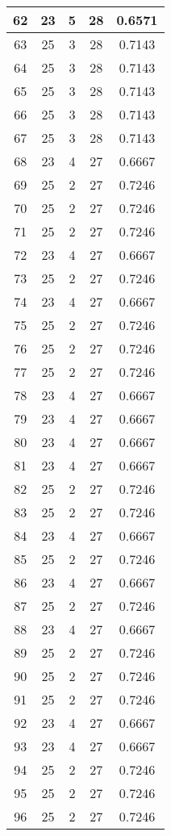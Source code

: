 \documentclass[letterpaper, 12pt]{article}
\begin{document}
\begin{longtable}{|c|c|c|c|c|}
\hline
62 & 23 & 5 & 28 & 0.6571 \\
\hline
63 & 25 & 3 & 28 & 0.7143 \\
\hline
64 & 25 & 3 & 28 & 0.7143 \\
\hline
65 & 25 & 3 & 28 & 0.7143 \\
\hline
66 & 25 & 3 & 28 & 0.7143 \\
\hline
67 & 25 & 3 & 28 & 0.7143 \\
\hline
68 & 23 & 4 & 27 & 0.6667 \\
\hline
69 & 25 & 2 & 27 & 0.7246 \\
\hline
70 & 25 & 2 & 27 & 0.7246 \\
\hline
71 & 25 & 2 & 27 & 0.7246 \\
\hline
72 & 23 & 4 & 27 & 0.6667 \\
\hline
73 & 25 & 2 & 27 & 0.7246 \\
\hline
74 & 23 & 4 & 27 & 0.6667 \\
\hline
75 & 25 & 2 & 27 & 0.7246 \\
\hline
76 & 25 & 2 & 27 & 0.7246 \\
\hline
77 & 25 & 2 & 27 & 0.7246 \\
\hline
78 & 23 & 4 & 27 & 0.6667 \\
\hline
79 & 23 & 4 & 27 & 0.6667 \\
\hline
80 & 23 & 4 & 27 & 0.6667 \\
\hline
81 & 23 & 4 & 27 & 0.6667 \\
\hline
82 & 25 & 2 & 27 & 0.7246 \\
\hline
83 & 25 & 2 & 27 & 0.7246 \\
\hline
84 & 23 & 4 & 27 & 0.6667 \\
\hline
85 & 25 & 2 & 27 & 0.7246 \\
\hline
86 & 23 & 4 & 27 & 0.6667 \\
\hline
87 & 25 & 2 & 27 & 0.7246 \\
\hline
88 & 23 & 4 & 27 & 0.6667 \\
\hline
89 & 25 & 2 & 27 & 0.7246 \\
\hline
90 & 25 & 2 & 27 & 0.7246 \\
\hline
91 & 25 & 2 & 27 & 0.7246 \\
\hline
92 & 23 & 4 & 27 & 0.6667 \\
\hline
93 & 23 & 4 & 27 & 0.6667 \\
\hline
94 & 25 & 2 & 27 & 0.7246 \\
\hline
95 & 25 & 2 & 27 & 0.7246 \\
\hline
96 & 25 & 2 & 27 & 0.7246 \\

\end{longtable}
\end{document}
